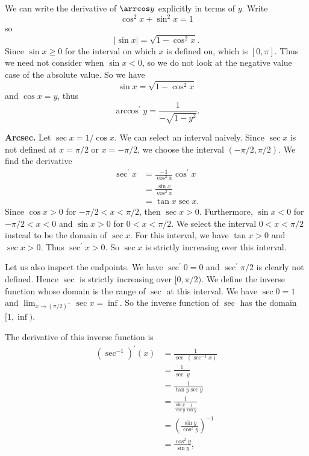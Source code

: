       We can write the derivative of $\arrcos y$ explicitly in terms of $y$. Write
      \[\cos^2 x + \sin^2 x = 1\]
      so
      \[|\sin x| = \sqrt{1 - \cos^2 x}.\]
      Since $\sin x \ge 0$ for the interval on which $x$ is defined on, which is $[0, \pi]$. Thus we need not consider when $\sin x < 0$, so we do not look at the negative value case of the absolute value. So we have
      \[\sin x = \sqrt{1 - \cos^2 x}\]
      and $\cos x = y$, thus
      \[\arccos^\prime y = \frac{1}{-\sqrt{1 - y^2}}.\]

      \textbf{Arcsec.} Let $\sec x = 1/\cos x$. We can select an interval naively. Since $\sec x$ is not defined at $x = \pi/2$ or $x = -\pi/2$, we choose the interval $(-\pi/2, \pi/2)$. We find the derivative
      \begin{align*}
        \sec^\prime x &= \frac{-1}{\cos^2 x} \cos^\prime x\\
        &= \frac{\sin x}{\cos^2 x}\\
        &= \tan x \sec x.
      \end{align*}
      Since $\cos x > 0$ for $-\pi/2 < x < \pi/2$, then $\sec x > 0$. Furthermore, $\sin x < 0$ for $-\pi/2 < x < 0$ and $\sin x > 0$ for $0 < x < \pi/2$. We select the interval $0 < x < \pi/2$ instead to be the domain of $\sec x$. For this interval, we have $\tan x > 0$ and $\sec x > 0$. Thus $\sec^\prime x > 0$. So $\sec x$ is strictly increasing over this interval.

      Let us also inspect the endpoints. We have $\sec^\prime 0 = 0$ and $\sec^\prime \pi/2$ is clearly not defined.
      Hence $\sec$ is strictly increasing over $[0, \pi/2)$. We define the inverse function whose domain is the range of $\sec$ at this interval. We have $\sec 0 = 1$ and $\lim_{x\to(\pi/2)^-} \sec x = \inf$. So the inverse function of $\sec$ has the domain $[1, \inf)$.

          The derivative of this inverse function is
          \begin{align*}
            (\sec^{-1})^\prime (x) &= \frac{1}{\sec^\prime (\sec^{-1} x)}\\
            &= \frac{1}{\sec^\prime y}\\
            &= \frac{1}{\tan y \sec y}\\
            &= \frac{1}{\frac{\sin y}{\cos y} \frac{1}{\cos y}}\\
            &= (\frac{\sin y}{\cos^2 y})^{-1}\\
            &= \frac{\cos^2 y}{\sin y},\\
          \end{align*}

